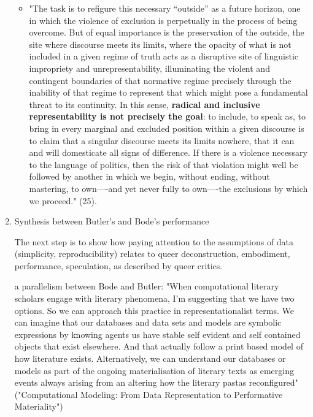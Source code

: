 \documentclass[11pt]{article}
\begin{document}
\begin{enumerate}
\begin{itemize}
\item "The task is to refigure this necessary “outside” as a future
horizon, one in which the violence of exclusion is perpetually
in the process of being overcome. But of equal importance is the
preservation of the outside, the site where discourse meets its
limits, where the opacity of what is not included in a given
regime of truth acts as a disruptive site of linguistic
impropriety and unrepresentability, illuminating the violent and
contingent boundaries of that normative regime precisely through
the inability of that regime to represent that which might pose
a fundamental threat to its continuity. In this sense, \textbf{radical
and inclusive representability is not precisely the goal}: to
include, to speak as, to bring in every marginal and excluded
position within a given discourse is to claim that a singular
discourse meets its limits nowhere, that it can and will
domesticate all signs of difference. If there is a violence
necessary to the language of politics, then the risk of that
violation might well be followed by another in which we begin,
without ending, without mastering, to own—-and yet never fully
to own—-the exclusions by which we proceed." (25).
\end{itemize}



\item Synthesis between Butler's and Bode's performance
\label{sec:org344b0f3}

The next step is to show how paying attention to the assumptions of
data (simplicity, reproducibility) relates to queer deconstruction,
embodiment, performance, speculation, as described by queer
critics. 

a parallelism between Bode and Butler: 
"When computational literary scholars engage with literary phenomena,
I'm suggesting that we have two options. So we can approach this
practice in representationalist terms. We can imagine that our
databases and data sets and models are symbolic expressions by knowing
agents us have stable self evident and self contained objects that
exist elsewhere. And that actually follow a print based model of how
literature exists. Alternatively, we can understand our databases or
models as part of the ongoing materialisation of literary texts as
emerging events always arising from an altering how the literary
pastas reconfigured" ("Computational Modeling: From Data Representation
to Performative Materiality")
\end{enumerate}
\end{document}
